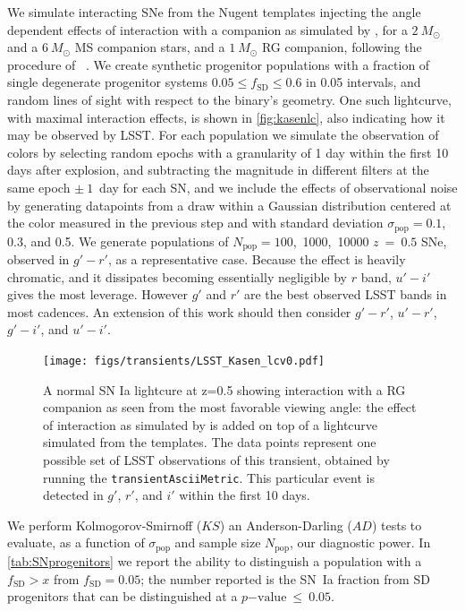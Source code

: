 We simulate interacting SNe from the Nugent templates \citep{Nugent02}
injecting the angle dependent effects of interaction with a companion
as simulated by \citep{Kasen10}, for a $2~M_\odot$ and a $6~M_\odot$
MS companion stars, and a $1~M_\odot$ RG companion, following the
procedure of ~\citep{Bianco11}. We create synthetic progenitor
populations with a fraction of single degenerate progenitor systems
$0.05 \leq f_\mathrm{SD} \leq 0.6 $ in 0.05 intervals, and random lines of
sight with respect to the binary's geometry. One such lightcurve, with
maximal interaction effects, is shown in \autoref{fig:kasenlc}, also
indicating how it may be observed by LSST. For each population we
simulate the observation of colors by selecting random epochs with a
granularity of 1 day within the first 10 days after explosion, and
subtracting the magnitude in different filters at the same epoch
$\pm~1$~day for each SN, and we include the effects of observational
noise by generating datapoints from a draw within a Gaussian
distribution centered at the color measured in the previous step and
with standard deviation $\sigma_\mathrm{pop} = 0.1$, 0.3, and 0.5.  We
generate populations of $N_\mathrm{pop}=100$,~1000,~10000 $z~=~0.5$ SNe,
observed in $g'-r'$, as a representative case. Because the effect is
heavily chromatic, and it dissipates becoming essentially negligible
by $r$ band, $u'-i'$ gives the most leverage. However $g'$ and $r'$
are the best observed LSST bands in most cadences. An extension of
this work should then consider $g'-r'$, $u'-r'$, $g'-i'$, and $u'-i'$.

\begin{figure}[hbt]
\centerline{
\texttt{[image: figs/transients/LSST\_Kasen\_lcv0.pdf]}
}
\caption{ A normal SN Ia lightcure at z=0.5 showing interaction with a
  RG companion as seen from the most favorable viewing angle: the
  effect of interaction as simulated by \citet{Kasen10} is added on
  top of a lightcurve simulated from the \citealt{Nugent02}
  templates. The data points represent one possible set of LSST
  observations of this transient, obtained by running the
  \texttt{transientAsciiMetric}.  This particular event is detected in
  $g'$, $r'$, and $i'$ within the first 10 days.}
\label{fig:kasenlc}
\end{figure}

We perform Kolmogorov-Smirnoff ($KS$) an Anderson-Darling ($AD$) tests
to evaluate, as a function of $\sigma_\mathrm{pop}$ and sample size
$N_\mathrm{pop}$, our diagnostic power. In \autoref{tab:SNprogenitors}
we report the ability to distinguish a population with a $f_\mathrm{SD} > x$ from
$f_\mathrm{SD}=0.05$; the number reported is the SN~Ia fraction from
SD progenitors that can be distinguished at a $p\mathrm{-value}~\leq
~0.05$.

